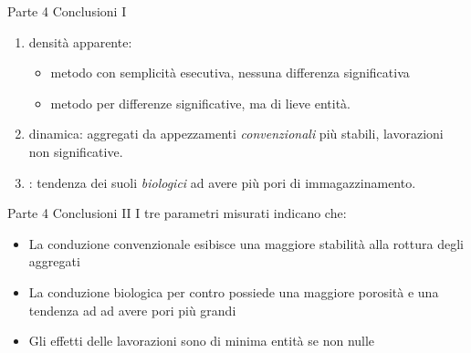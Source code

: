\documentclass[xcolor={usenames, table, x11names}, final, 10pt]{beamer}
\begin{document}
\begin{frame}[label=finale]{Parte 4 \small{Conclusioni I}}
  \begin{enumerate}[<+->]
  \item densità apparente:
    \begin{itemize}
    \item metodo con \hyperlink{Core}{} semplicità esecutiva,
      nessuna differenza significativa
    \item metodo per \hyperlink{Clod}{}
      differenze significative, ma di lieve entità.
    \end{itemize}
  \item \hyperlink{distribuzione}{} dinamica:
    aggregati da appezzamenti \emph{convenzionali} più stabili,
    lavorazioni non significative.
  \item \hyperlink{Porosimetria}{}: tendenza  dei suoli
    \emph{biologici} ad avere più pori di immagazzinamento.
  \end{enumerate}

\end{frame}

\begin{frame}{Parte 4 \small{Conclusioni II}}
  I tre parametri misurati indicano che:
  \begin{itemize}[<+->]
    \pause
  \item La conduzione convenzionale esibisce una maggiore stabilità
    alla rottura degli aggregati
  \item La conduzione biologica  per contro possiede una maggiore
    porosità e una tendenza ad ad avere pori più grandi
  \item Gli effetti delle lavorazioni sono di minima entità se non nulle
  \end{itemize}

\end{frame}



\begin{frame}
\end{frame}

\end{document}
